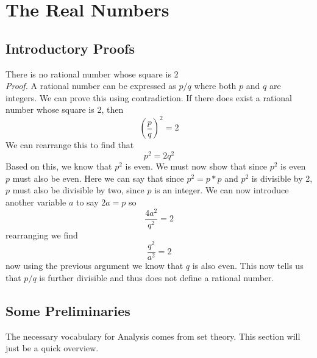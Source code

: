 \chapter{The Real Numbers}
\section{Introductory Proofs}
\begin{theorem}
There is no rational number whose square is 2 \\
\textit{Proof.} A rational number can be expressed as $ p/q $ where both $ p $ and $ q $ are integers. We can prove this using contradiction. If there does exist a rational number whose square is 2, then $$ \left(\dfrac{p}{q}\right)^2 = 2$$ We can rearrange this to find that \[ p^2 = 2 q^2 \] Based on this, we know that $ p^2 $ is even. We must now show that since $ p^2 $ is even $ p $ must also be even. Here we can say that since $ p^2 = p * p $ and $ p^2 $ is divisible by 2, $ p $ must also be divisible by two, since $ p $ is an integer. We can now introduce another variable $ a $ to say $ 2a = p $ so \[ \dfrac{4a^2}{q^2} = 2 \] rearranging we find 
\[ \dfrac{q^2}{a^2} = 2 \] now using the previous argument we know that $ q $ is also even. This now tells us that $ p/q $ is further divisible and thus does not define a rational number.  
\end{theorem} 																		 						
\section{Some Preliminaries}
The necessary vocabulary for Analysis comes from set theory. This section will just be a quick overview. \\

